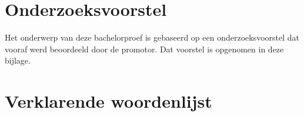 \documentclass{bachproef-tin}
\begin{document}
%
%




\appendix
\renewcommand{\chaptername}{Appendix}


\chapter{Onderzoeksvoorstel}

Het onderwerp van deze bachelorproef is gebaseerd op een onderzoeksvoorstel dat vooraf werd beoordeeld door de promotor. Dat voorstel is opgenomen in deze bijlage.



\chapter{Verklarende woordenlijst}

\clearpage


\printbibliography[heading=bibintoc]
\end{document}
